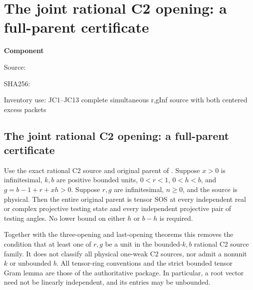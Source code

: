 \chapter{The joint rational C2 opening: a full-parent certificate}
\label{component:p8f912583feaa}
\noindent\textbf{Component }\par
{\small\noindent Source: \par}
{\small\noindent SHA256: \par}
{\small\noindent Inventory use: JC1--JC13 complete simultaneous r,gInf source with both centered excess packets\par}
\medskip
\section[The joint rational C2 opening: a full-parent certificate]{The joint rational C2 opening: a full-parent certificate}
\label{p8f912583feaa:sec:c2-joint-centered}

\begin{theorem}
Use the exact rational C2 source and original parent of
.  Suppose $x>0$ is infinitesimal,
$k,b$ are positive bounded units, $0<r<1$, $0<h<b$, and
$g=b-1+r+xh>0$.  Suppose $r,g$ are infinitesimal, $n\geq0$, and
the source is physical.  Then the entire original parent is tensor
SOS at every independent real or complex projective testing state
and every independent projective pair of testing angles.  No lower
bound on either $h$ or $b-h$ is required.
\end{theorem}

Together with the three-opening and last-opening theorems this
removes the condition that at least one of $r,g$ be a unit in the
bounded-$k,b$ rational C2 source family.  It does not classify all
physical one-weak C2 sources, nor admit a nonunit $k$ or unbounded $b$.
All tensor-ring conventions and the strict bounded tensor Gram lemma
are those of the authoritative package.  In particular, a root vector
need not be linearly independent, and its entries may be unbounded.

